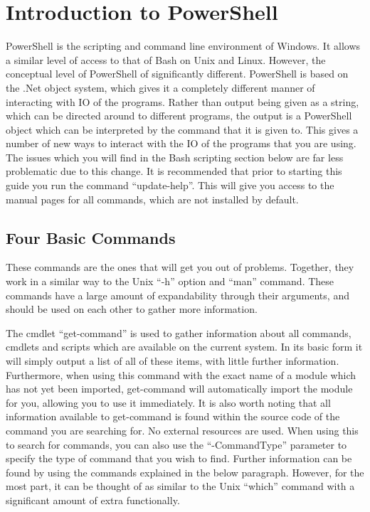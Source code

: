 	\section{Introduction to PowerShell}
		PowerShell is the scripting and command line environment of Windows.\cite{EffectivePS} 
		It allows a similar level of access to that of Bash on Unix and Linux. 
		However, the conceptual level of PowerShell of significantly different. 
		PowerShell is based on the .Net object system, which gives it a completely different manner of interacting with IO of the programs. 
		Rather than output being given as a string, which can be directed around to different programs, the output is a PowerShell object which can be interpreted by the command that it is given to. 
		This gives a number of new ways to interact with the IO of the programs that you are using. 
		The issues which you will find in the Bash scripting section below are far less problematic due to this change. 
		It is recommended that prior to starting this guide you run the command ``update-help''. 
		This will give you access to the manual pages for all commands, which are not installed by default. 
		\subsection{Four Basic Commands}
			These commands are the ones that will get you out of problems. 
			Together, they work in a similar way to the Unix ``-h'' option and ``man'' command. 
			These commands have a large amount of expandability through their arguments, and should be used on each other to gather more information. 

			The cmdlet ``get-command'' is used to gather information about all commands, cmdlets and scripts which are available on the current system. 
			In its basic form it will simply output a list of all of these items, with little further information.
			Furthermore, when using this command with the exact name of a module which has not yet been imported, get-command will automatically import the module for you, allowing you to use it immediately. 
			It is also worth noting that all information available to get-command is found within the source code of the command you are searching for. 
			No external resources are used.
			When using this to search for commands, you can also use the ``-CommandType'' parameter to specify the type of command that you wish to find. 
			Further information can be found by using the commands explained in the below paragraph. 
			However, for the most part, it can be thought of as similar to the Unix ``which'' command with a significant amount of extra functionally. 

